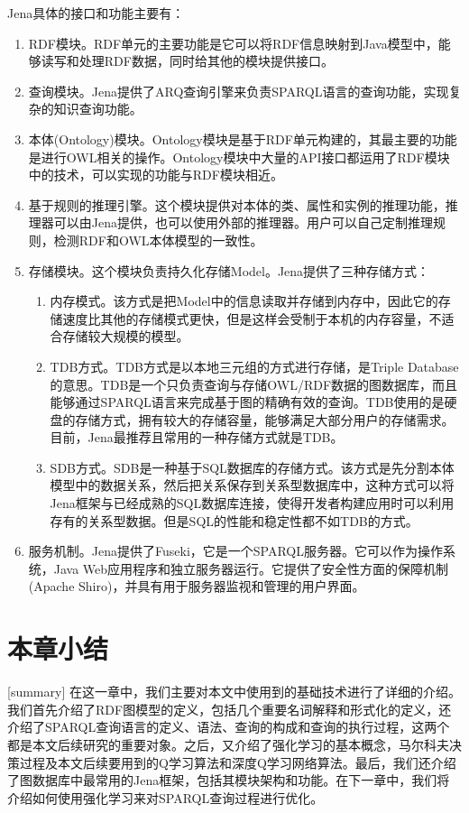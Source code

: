 Jena具体的接口和功能主要有：
\begin{enumerate}
    \item RDF模块。RDF单元的主要功能是它可以将RDF信息映射到Java模型中，能够读写和处理RDF数据，同时给其他的模块提供接口。
    \item 查询模块。Jena提供了ARQ查询引擎来负责SPARQL语言的查询功能，实现复杂的知识查询功能。
    \item 本体(Ontology)模块。Ontology模块是基于RDF单元构建的，其最主要的功能是进行OWL相关的操作。Ontology模块中大量的API接口都运用了RDF模块中的技术，可以实现的功能与RDF模块相近。
    \item 基于规则的推理引擎。这个模块提供对本体的类、属性和实例的推理功能，推理器可以由Jena提供，也可以使用外部的推理器。用户可以自己定制推理规则，检测RDF和OWL本体模型的一致性。
    \item 存储模块。这个模块负责持久化存储Model。Jena提供了三种存储方式：
    \begin{enumerate}
        \item 内存模式。该方式是把Model中的信息读取并存储到内存中，因此它的存储速度比其他的存储模式更快，但是这样会受制于本机的内存容量，不适合存储较大规模的模型。
        \item TDB方式。TDB方式是以本地三元组的方式进行存储，是Triple Database的意思。TDB是一个只负责查询与存储OWL/RDF数据的图数据库，而且能够通过SPARQL语言来完成基于图的精确有效的查询。TDB使用的是硬盘的存储方式，拥有较大的存储容量，能够满足大部分用户的存储需求。目前，Jena最推荐且常用的一种存储方式就是TDB。
        \item SDB方式。SDB是一种基于SQL数据库的存储方式。该方式是先分割本体模型中的数据关系，然后把关系保存到关系型数据库中，这种方式可以将Jena框架与已经成熟的SQL数据库连接，使得开发者构建应用时可以利用存有的关系型数据。但是SQL的性能和稳定性都不如TDB的方式。
    \end{enumerate}
    \item 服务机制。Jena提供了Fuseki，它是一个SPARQL服务器。它可以作为操作系统，Java Web应用程序和独立服务器运行。它提供了安全性方面的保障机制(Apache Shiro)，并具有用于服务器监视和管理的用户界面。
\end{enumerate}

\section{本章小结}[summary]
在这一章中，我们主要对本文中使用到的基础技术进行了详细的介绍。我们首先介绍了RDF图模型的定义，包括几个重要名词解释和形式化的定义，还介绍了SPARQL查询语言的定义、语法、查询的构成和查询的执行过程，这两个都是本文后续研究的重要对象。之后，又介绍了强化学习的基本概念，马尔科夫决策过程及本文后续要用到的Q学习算法和深度Q学习网络算法。最后，我们还介绍了图数据库中最常用的Jena框架，包括其模块架构和功能。在下一章中，我们将介绍如何使用强化学习来对SPARQL查询过程进行优化。

